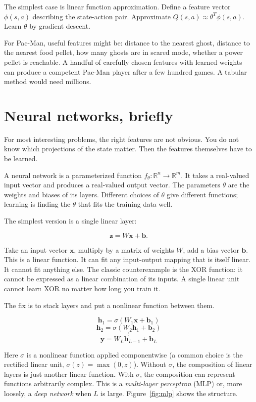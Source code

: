 The simplest case is linear function approximation. Define a feature vector $\phi(s, a)$ describing the state-action pair. Approximate $Q(s, a) \approx \theta^T \phi(s, a)$. Learn $\theta$ by gradient descent.

For Pac-Man, useful features might be: distance to the nearest ghost, distance to the nearest food pellet, how many ghosts are in scared mode, whether a power pellet is reachable. A handful of carefully chosen features with learned weights can produce a competent Pac-Man player after a few hundred games. A tabular method would need millions.

\section*{Neural networks, briefly}

For most interesting problems, the right features are not obvious. You do not know which projections of the state matter. Then the features themselves have to be learned.

A neural network is a parameterized function $f_\theta: \mathbb{R}^n \to \mathbb{R}^m$. It takes a real-valued input vector and produces a real-valued output vector. The parameters $\theta$ are the weights and biases of its layers. Different choices of $\theta$ give different functions; learning is finding the $\theta$ that fits the training data well.

The simplest version is a single linear layer:

$$\mathbf{z} = W \mathbf{x} + \mathbf{b}.$$

Take an input vector $\mathbf{x}$, multiply by a matrix of weights $W$, add a bias vector $\mathbf{b}$. This is a linear function. It can fit any input-output mapping that is itself linear. It cannot fit anything else. The classic counterexample is the XOR function: it cannot be expressed as a linear combination of its inputs. A single linear unit cannot learn XOR no matter how long you train it.

The fix is to stack layers and put a nonlinear function between them.

$$\mathbf{h}_1 = \sigma(W_1 \mathbf{x} + \mathbf{b}_1)$$
$$\mathbf{h}_2 = \sigma(W_2 \mathbf{h}_1 + \mathbf{b}_2)$$
$$\vdots$$
$$\mathbf{y} = W_L \mathbf{h}_{L-1} + \mathbf{b}_L$$

Here $\sigma$ is a nonlinear function applied componentwise (a common choice is the rectified linear unit, $\sigma(z) = \max(0, z)$). Without $\sigma$, the composition of linear layers is just another linear function. With $\sigma$, the composition can represent functions arbitrarily complex. This is a \emph{multi-layer perceptron} (MLP) or, more loosely, a \emph{deep network} when $L$ is large. Figure~\ref{fig:mlp} shows the structure.

